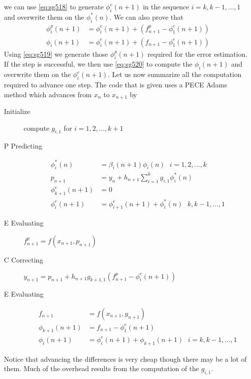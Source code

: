 we can use \autoref{eq:sg518} to generate $\phi ^{e}_{i} (n+1)$ in the sequence 
$i=k, k-1, \dots ,1$ and overwrite them on the $\phi ^{*}_{i} (n)$. 
We can also prove that
\begin{equation}
    \begin{aligned}
        \phi ^{p}_{i} (n+1) &= \phi ^{e}_{i} (n+1) + 
            \left( f^{p}_{n+1} - \phi ^{e}_{1} (n+1) \right) \label{eq:sg519} \\
        \phi _{i} (n+1) &= \phi ^{e}_{i} (n+1) + 
            \left( f_{n+1} - \phi ^{e}_{1} (n+1) \right) \label{eq:sg520}
    \end{aligned}
\end{equation}
Using \autoref{eq:sg519} we generate those $\phi ^{p}_{i} (n+1)$ required for 
the error estimation. If 
the step is successful, we then use \autoref{eq:sg520} to compute the 
$\phi _{i} (n+1)$ and overwrite them on the $\phi ^{e}_{i} (n+1)$.
Let us now summarize all the computation required to advance one step.
The code that is given uses a PECE Adams method which advances from $x_n$ to 
$x_{n+1}$ by
\begin{description}
    \item[Initialize] compute $g_{i,1}$ for $i=1,2, \dots ,k+1$
    \item[P Predicting] 
        \begin{equation}
            \begin{aligned}
                \phi ^{*}_{i} (n) &= \beta _i(n+1) \phi _i(n) \text{ } i=1,2, \dots ,k \\
                p_{n+1} &= y_n + h_{n+1} \sum_{i=1}^{k} g_{i,1} \phi ^{*}_{i} (n) \\
                \phi ^{e}_{k+1} (n+1) &= 0 \\
                \phi ^{e}_{i} (n+1) &= \phi ^{e}_{i+1} (n+1) + \phi ^{*}_{i} (n) \text{ } k,k-1,\dots ,1
            \end{aligned}
        \end{equation}
    \item[E Evaluating] $f^{p}_{n+1} = f(x_{n+1}, p_{n+1})$
    \item[C Correcting] $y_{n+1} = p_{n+1} + h_{n+1} g_{k+1,1} 
        \left( f^{p}_{n+1} - \phi ^{e}_{i} (n+1) \right)$
    \item[E Evaluating]
        \begin{equation}
            \begin{aligned}
                f_{n+1} &= f(x_{n+1}, y_{n+1}) \\
                \phi _{k+1} (n+1) &= f_{n+1} - \phi ^{e}_{1} (n+1) \\
                \phi _{i} (n+1) &= \phi ^{e}_{i} (n+1) + \phi _{k+1} (n+1) \text{ } i=k,k-1,\dots ,1
            \end{aligned}
        \end{equation}
\end{description}
Notice that advancing the differences is very cheap though there may be a 
lot of them. Much of the overhead results from the computation of the $g_{i,1}$.

